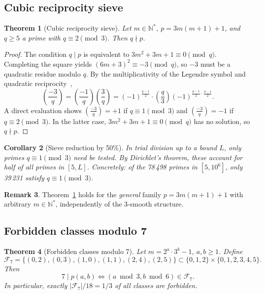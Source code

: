 \documentclass[11pt,a4paper]{article}
\theoremstyle{plain}
\newtheorem{theorem}{Theorem}[section]
\newtheorem{corollary}[theorem]{Corollary}
\theoremstyle{definition}
\newtheorem{remark}[theorem]{Remark}
\begin{document}
\subsection{Cubic reciprocity sieve}

\begin{rigorousbox}
\begin{theorem}[Cubic reciprocity sieve]\label{thm:cubic}
Let $m \in \mathbb{N}^*$, $p = 3m(m+1) + 1$, and $q \ge 5$ a prime with
$q \equiv 2 \pmod{3}$. Then $q \nmid p$.
\end{theorem}
\end{rigorousbox}

\begin{proof}
The condition $q \mid p$ is equivalent to $3m^2 + 3m + 1 \equiv 0 \pmod{q}$.
Completing the square yields $(6m + 3)^2 \equiv -3 \pmod{q}$, so $-3$ must be
a quadratic residue modulo $q$. By the multiplicativity of the Legendre symbol
and quadratic reciprocity~\cite{ireland-rosen},
\[
\left(\frac{-3}{q}\right)
= \left(\frac{-1}{q}\right)\left(\frac{3}{q}\right)
= (-1)^{\frac{q-1}{2}} \cdot \left(\frac{q}{3}\right) (-1)^{\frac{q-1}{2} \cdot \frac{3-1}{2}}.
\]
A direct evaluation shows $\left(\frac{-3}{q}\right) = +1$ if
$q \equiv 1 \pmod{3}$ and $\left(\frac{-3}{q}\right) = -1$ if
$q \equiv 2 \pmod{3}$. In the latter case, $3m^2 + 3m + 1 \equiv 0 \pmod{q}$
has no solution, so $q \nmid p$.
\end{proof}

\begin{corollary}[Sieve reduction by 50\%]\label{cor:cubic}
In trial division up to a bound $L$, only primes $q \equiv 1 \pmod{3}$ need
be tested. By Dirichlet's theorem, these account for half of all primes in
$[5, L]$. Concretely: of the 78\,498 primes in $[5, 10^6]$, only 39\,231
satisfy $q \equiv 1 \pmod{3}$.
\end{corollary}

\begin{remark}
Theorem~\ref{thm:cubic} holds for the \emph{general} family $p = 3m(m+1) + 1$
with arbitrary $m \in \mathbb{N}^*$, independently of the 3-smooth structure.
\end{remark}

\subsection{Forbidden classes modulo 7}

\begin{rigorousbox}
\begin{theorem}[Forbidden classes modulo 7]\label{thm:mod7}
Let $m = 2^a \cdot 3^b - 1$, $a, b \ge 1$. Define
\[
\mathcal{F}_7 = \bigl\{(0, 2), (0, 3), (1, 0), (1, 1), (2, 4), (2, 5)\bigr\}
\subset \{0, 1, 2\} \times \{0, 1, 2, 3, 4, 5\}.
\]
Then
\[
7 \mid p(a, b) \iff (a \bmod 3, b \bmod 6) \in \mathcal{F}_7.
\]
In particular, exactly $|\mathcal{F}_7|/18 = 1/3$ of all classes are forbidden.
\end{theorem}
\end{rigorousbox}
\end{document}
